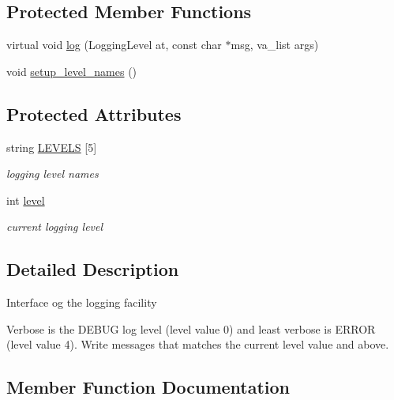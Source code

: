 \subsection*{Protected Member Functions}
\begin{DoxyCompactItemize}
\item 
virtual void \hyperlink{classatmi_1_1logger_a5857a38d25d80a987ca1c7320bab1e74}{log} (Logging\+Level at, const char $\ast$msg, va\+\_\+list args)
\item 
void \hyperlink{classatmi_1_1logger_a775b09e9c2cdae0ff2b69216c8fb520a}{setup\+\_\+level\+\_\+names} ()
\end{DoxyCompactItemize}
\subsection*{Protected Attributes}
\begin{DoxyCompactItemize}
\item 
\hypertarget{classatmi_1_1logger_acaf86896f0cb3f7307ffc523b13607e0}{}string \hyperlink{classatmi_1_1logger_acaf86896f0cb3f7307ffc523b13607e0}{L\+E\+V\+E\+L\+S} \mbox{[}5\mbox{]}\label{classatmi_1_1logger_acaf86896f0cb3f7307ffc523b13607e0}

\begin{DoxyCompactList}\small\item\em logging level names \end{DoxyCompactList}\item 
\hypertarget{classatmi_1_1logger_a70bf3a05b911b63d4548507fdea5dfbd}{}int \hyperlink{classatmi_1_1logger_a70bf3a05b911b63d4548507fdea5dfbd}{level}\label{classatmi_1_1logger_a70bf3a05b911b63d4548507fdea5dfbd}

\begin{DoxyCompactList}\small\item\em current logging level \end{DoxyCompactList}\end{DoxyCompactItemize}


\subsection{Detailed Description}
Interface og the logging facility

Verbose is the D\+E\+B\+U\+G log level (level value 0) and least verbose is E\+R\+R\+O\+R (level value 4). Write messages that matches the current level value and above. 

\subsection{Member Function Documentation}
\hypertarget{classatmi_1_1logger_a6ccf708a9c54be81433f7164a5bf33a4}{}
